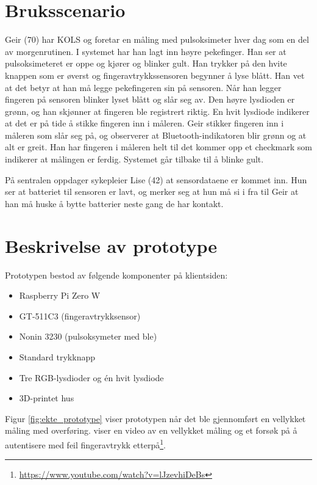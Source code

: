 \section{Bruksscenario}
Geir (70) har KOLS og foretar en måling med pulsoksimeter hver dag som en del av morgenrutinen. I systemet har han lagt
inn høyre pekefinger. Han ser at pulsoksimeteret
er oppe og kjører og blinker gult. Han trykker på den hvite knappen som er øverst og fingeravtrykkssensoren begynner
å lyse blått. Han vet at det betyr at han må legge pekefingeren sin på sensoren. Når han legger fingeren på sensoren blinker
lyset blått og slår seg av. Den høyre lysdioden er grønn, og han skjønner at fingeren ble registrert riktig. En hvit lysdiode
indikerer at det er på tide å stikke fingeren inn i måleren. Geir stikker fingeren inn i måleren som slår seg på,
og observerer at Bluetooth-indikatoren blir grønn og at alt er greit. Han har fingeren i måleren helt til det kommer opp et checkmark
som indikerer at målingen er ferdig. Systemet går tilbake til å blinke gult.

På sentralen oppdager sykepleier Lise (42) at sensordataene er kommet inn. Hun ser at batteriet til sensoren er lavt, og merker seg at hun
må si i fra til Geir at han må huske å bytte batterier neste gang de har kontakt.

\section{Beskrivelse av prototype}
Prototypen bestod av følgende komponenter på klientsiden:

\begin{itemize}
  \item Raspberry Pi Zero W
  \item GT-511C3 (fingeravtrykksensor)
  \item Nonin 3230 (pulsoksymeter med \gls{ble})
  \item Standard trykknapp
  \item Tre RGB-lysdioder og én hvit lysdiode
  \item 3D-printet hus
\end{itemize}

Figur \ref{fig:ekte_prototype} viser prototypen når det ble gjennomført en vellykket
måling med overføring. \citet{youtube} viser en video av en vellykket måling og et forsøk på å autentisere med feil
fingeravtrykk etterpå\footnote{\url{https://www.youtube.com/watch?v=lJzevhiDeBs}}.


